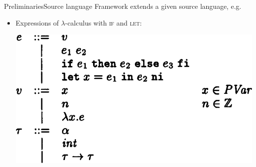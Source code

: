 \documentclass{beamer}
\begin{document}
\begin{frame}{Preliminaries}{Source language}
  Framework extends a given source language, e.g.\
  \begin{itemize}
  \item Expressions of $\lambda$-calculus with \textsc{if} and \textsc{let}:
    \begin{center}\includegraphics[scale=0.25]{paper_sourcelang.png}\end{center}
  \end{itemize}
\end{frame}

\end{document}

